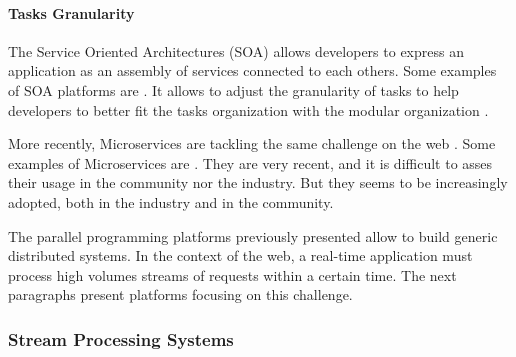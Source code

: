 
\paragraph{Tasks Granularity}

The Service Oriented Architectures (SOA) allows developers to express an application as an assembly of services connected to each others.
Some examples of SOA platforms are .
It allows to adjust the granularity of tasks to help developers to better fit the tasks organization with the modular organization \cite{Adam2008}.

More recently, Microservices are tackling the same challenge on the web \cite{Fernandez-Villamor2010,Fowler2014,Namiot2014}.
Some examples of Microservices are .
They are very recent, and it is difficult to asses their usage in the community nor the industry.
But they seems to be increasingly adopted, both in the industry and in the community.



\separator

The parallel programming platforms previously presented allow to build generic distributed systems.
In the context of the web, a real-time application must process high volumes streams of requests within a certain time.
The next paragraphs present platforms focusing on this challenge.


\subsubsection{Stream Processing Systems}

